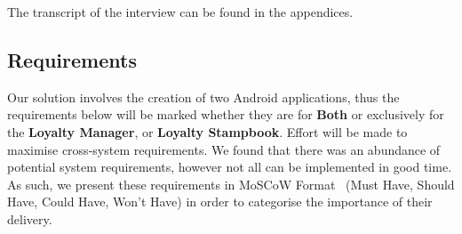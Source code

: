 The transcript of the interview can be found in the appendices. 

\clearpage{}

\subsection{Requirements}
Our solution involves the creation of two Android applications, thus the requirements below will be marked whether they are for \textbf{Both} or exclusively for the \textbf{Loyalty Manager}, or \textbf{Loyalty Stampbook}. Effort will be made to maximise cross-system requirements. We found that there was an abundance of potential system requirements, however not all can be implemented in good time. As such, we present these requirements in MoSCoW Format~\cite{brennan2009guide} (Must Have, Should Have, Could Have, Won't Have) in order to categorise the importance of their delivery.

